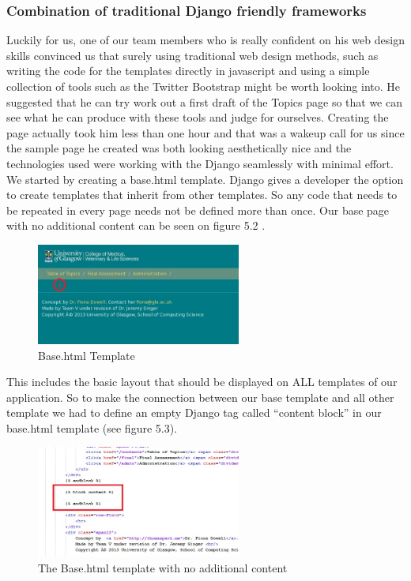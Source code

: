 \documentclass{l3proj}
\begin{document}
\subsubsection{Combination of traditional Django friendly frameworks}
Luckily for us, one of our team members who is really confident on his web design skills
convinced us that surely using traditional web design methods, such as writing the code for the templates directly in javascript and using a simple collection of tools such as the Twitter Bootstrap might be worth looking into. He suggested that he can try work out a first draft of the Topics page so that we can see what he can produce with these tools and judge for ourselves. Creating the page actually took him less than one hour and that was a wakeup call for us since the sample page he created was both looking aesthetically nice and the technologies used were working with the Django seamlessly with minimal effort. 
We started by creating a base.html template. Django gives a developer the option to create templates that inherit from other templates. So any code that needs to be repeated in every page needs not be defined more than once. Our base page with no additional content can be seen on figure 5.2 .
\begin{figure}[h!]
\caption{Base.html Template}
\centering
\includegraphics[width=0.6\textwidth]{images/base.jpg}
\end{figure}
This includes the basic layout that should be displayed on ALL templates of our application. So to make the connection between our base template and all other template we had to define an empty Django tag called “content block” in our base.html template (see figure 5.3). 
\begin{figure}[h!]
\caption{The Base.html template with no additional content}
\centering
\includegraphics[width=0.6\textwidth]{images/baseblock.jpg}
\end{figure}
\end{document}
